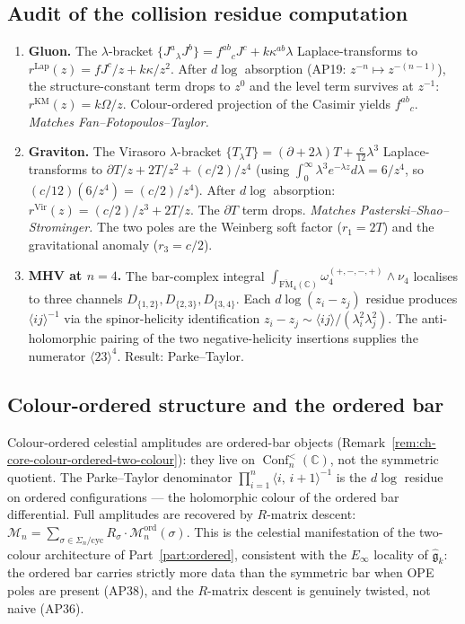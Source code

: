 \documentclass[11pt]{article}
\newcommand{\cM}{\mathcal{M}}
\newcommand{\fg}{\mathfrak{g}}
\newcommand{\C}{\mathbb{C}}
\DeclareMathOperator{\Conf}{Conf}
\begin{document}
\subsection*{Audit of the collision residue computation}

\begin{enumerate}[label=(\roman*),nosep]
\item \textbf{Gluon.}  The $\lambda$-bracket $\{J^a{}_\lambda J^b\} =
  f^{ab}{}_c J^c + k\kappa^{ab}\lambda$ Laplace-transforms to
  $r^{\mathrm{Lap}}(z) = fJ^c/z + k\kappa/z^2$.  After $d\log$
  absorption (AP19: $z^{-n}\mapsto z^{-(n-1)}$), the structure-constant
  term drops to $z^0$ and the level term survives at $z^{-1}$:
  $r^{\mathrm{KM}}(z) = k\Omega/z$.  Colour-ordered projection of the
  Casimir yields $f^{ab}{}_c$.  \emph{Matches Fan--Fotopoulos--Taylor.}

\item \textbf{Graviton.}  The Virasoro $\lambda$-bracket
  $\{T{}_\lambda T\} = (\partial + 2\lambda)T + \frac{c}{12}\lambda^3$
  Laplace-transforms to $\partial T/z + 2T/z^2 + (c/2)/z^4$ (using
  $\int_0^\infty \lambda^3 e^{-\lambda z}d\lambda = 6/z^4$, so
  $(c/12)(6/z^4) = (c/2)/z^4$).  After $d\log$ absorption:
  $r^{\mathrm{Vir}}(z) = (c/2)/z^3 + 2T/z$.  The $\partial T$ term
  drops.  \emph{Matches Pasterski--Shao--Strominger.}  The two poles
  are the Weinberg soft factor ($r_1 = 2T$) and the gravitational
  anomaly ($r_3 = c/2$).

\item \textbf{MHV at $n=4$.}  The bar-complex integral
  $\int_{\overline{\mathrm{FM}}_4(\C)} \omega_4^{(+,-,-,+)} \wedge \nu_4$
  localises to three channels $D_{\{1,2\}}, D_{\{2,3\}}, D_{\{3,4\}}$.
  Each $d\log(z_i - z_j)$ residue produces $\langle ij\rangle^{-1}$ via
  the spinor-helicity identification $z_i - z_j \sim \langle ij\rangle /
  (\lambda_i^2\lambda_j^2)$.  The anti-holomorphic pairing of the two
  negative-helicity insertions supplies the numerator
  $\langle 23\rangle^4$.  Result: Parke--Taylor.
\end{enumerate}

\subsection*{Colour-ordered structure and the ordered bar}

Colour-ordered celestial amplitudes are ordered-bar objects
(Remark~\ref{rem:ch-core-colour-ordered-two-colour}): they live on
$\Conf_n^{<}(\C)$, not the symmetric quotient.  The Parke--Taylor
denominator $\prod_{i=1}^n \langle i,\, i{+}1\rangle^{-1}$ is the
$d\log$ residue on ordered configurations --- the holomorphic colour
of the ordered bar differential.  Full amplitudes are recovered by
$R$-matrix descent: $\cM_n = \sum_{\sigma \in \Sigma_n/\mathrm{cyc}}
R_\sigma \cdot \cM_n^{\mathrm{ord}}(\sigma)$.  This is the celestial
manifestation of the two-colour architecture of Part~\ref{part:ordered},
consistent with the $E_\infty$ locality of $\widehat{\fg}_k$: the
ordered bar carries strictly more data than the symmetric bar when OPE
poles are present (AP38), and the $R$-matrix descent is genuinely
twisted, not naive (AP36).
\end{document}
